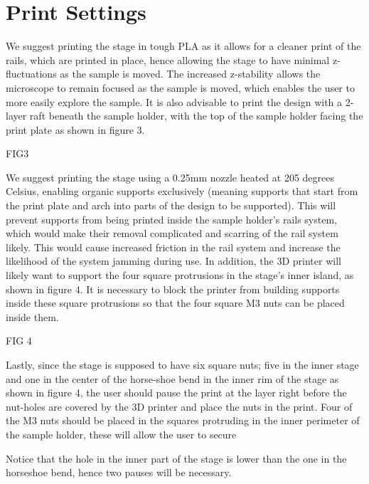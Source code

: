 \documentclass[runningheads]{llncs}
\begin{document}
\section*{Print Settings}

We suggest printing the stage in tough PLA as it allows for a cleaner print of the rails, which are printed in place, hence allowing the stage to have minimal z-fluctuations as the sample is moved. The increased z-stability allows the microscope to remain focused as the sample is moved, which enables the user to more easily explore the sample. It is also advisable to print the design with a 2-layer raft beneath the sample holder, with the top of the sample holder facing the print plate as shown in figure 3.

FIG3

We suggest printing the stage using a 0.25mm nozzle heated at 205 degrees Celsius, enabling organic supports exclusively (meaning supports that start from the print plate and arch into parts of the design to be supported). This will prevent supports from being printed inside the sample holder's rails system, which would make their removal complicated and scarring of the rail system likely. This would cause increased friction in the rail system and increase the likelihood of the system jamming during use. In addition, the 3D printer will likely want to support the four square protrusions in the stage's inner island, as shown in figure 4. It is necessary to block the printer from building supports inside these square protrusions so that the four square M3 nuts can be placed inside them.

FIG 4


Lastly, since the stage is supposed to have six square nuts; five in the inner stage and one in the center of the horse-shoe bend in the inner rim of the stage as shown in figure 4, the user should pause the print at the layer right before the nut-holes are covered by the 3D printer and place the nuts in the print. Four of the M3 nuts should be placed in the squares protruding in the inner perimeter of the sample holder, these will allow the user to secure 

Notice that the hole in the inner part of the stage is lower than the one in the horseshoe bend, hence two pauses will be necessary.
\end{document}
